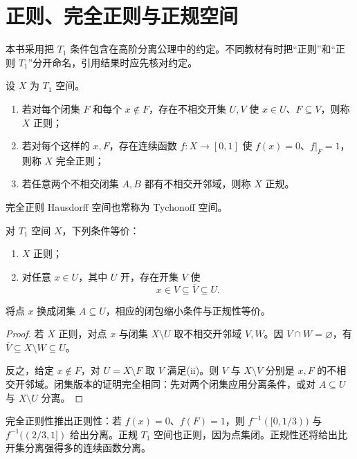 \section{正则、完全正则与正规空间}

本书采用把 \(T_1\) 条件包含在高阶分离公理中的约定。不同教材有时把“正则”和“正则 \(T_1\)”分开命名，引用结果时应先核对约定。

\begin{definition}
设 \(X\) 为 \(T_1\) 空间。
\begin{enumerate}[label=\textup{(\roman*)}]
 \item 若对每个闭集 \(F\) 和每个 \(x\notin F\)，存在不相交开集 \(U,V\) 使 \(x\in U\)、\(F\subseteq V\)，则称 \(X\) 正则；
 \item 若对每个这样的 \(x,F\)，存在连续函数 \(f:X\to[0,1]\) 使 \(f(x)=0\)、\(f|_F=1\)，则称 \(X\) 完全正则；
 \item 若任意两个不相交闭集 \(A,B\) 都有不相交开邻域，则称 \(X\) 正规。
\end{enumerate}
完全正则 Hausdorff 空间也常称为 Tychonoff 空间。
\end{definition}

\begin{proposition}[闭包缩小判据]
\label{prop:regular-shrinking}
对 \(T_1\) 空间 \(X\)，下列条件等价：
\begin{enumerate}[label=\textup{(\roman*)}]
 \item \(X\) 正则；
 \item 对任意 \(x\in U\)，其中 \(U\) 开，存在开集 \(V\) 使
 \[
  x\in V\subseteq\overline V\subseteq U.
 \]
\end{enumerate}
将点 \(x\) 换成闭集 \(A\subseteq U\)，相应的闭包缩小条件与正规性等价。
\end{proposition}

\begin{proof}
若 \(X\) 正则，对点 \(x\) 与闭集 \(X\setminus U\) 取不相交开邻域 \(V,W\)。因 \(V\cap W=\varnothing\)，有 \(\overline V\subseteq X\setminus W\subseteq U\)。

反之，给定 \(x\notin F\)，对 \(U=X\setminus F\) 取 \(V\) 满足(ii)。则 \(V\) 与 \(X\setminus\overline V\) 分别是 \(x,F\) 的不相交开邻域。闭集版本的证明完全相同：先对两个闭集应用分离条件，或对 \(A\subseteq U\) 与 \(X\setminus U\) 分离。
\end{proof}

完全正则性推出正则性：若 \(f(x)=0\)、\(f(F)=1\)，则
\(f^{-1}([0,1/3))\) 与 \(f^{-1}((2/3,1])\) 给出分离。正规 \(T_1\) 空间也正则，因为点集闭。正规性还将给出比开集分离强得多的连续函数分离。

